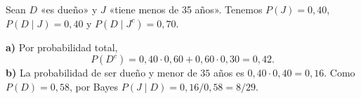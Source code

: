 Sean $D$ «es dueño» y $J$ «tiene menos de 35 años». Tenemos $P(J)=0{,}40$, $P(D\mid J)=0{,}40$ y $P(D\mid J^c)=0{,}70$.

\textbf{a)} Por probabilidad total,
\[
P(D^c)=0{,}40\cdot0{,}60+0{,}60\cdot0{,}30=\boxed{0{,}42}.
\]
\textbf{b)} La probabilidad de ser dueño y menor de $35$ años es $0{,}40\cdot0{,}40=0{,}16$. Como $P(D)=0{,}58$, por Bayes $P(J\mid D)=0{,}16/0{,}58=\boxed{8/29}$.
